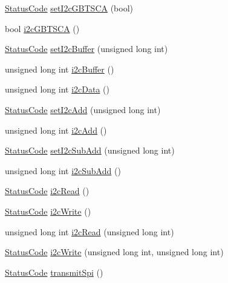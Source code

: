 \begin{DoxyCompactItemize}
\hyperlink{classStatusCode}{Status\+Code} \hyperlink{classFePGA_ac9a16de5f01fda901494abe61efb5029}{set\+I2c\+G\+B\+T\+S\+CA} (bool)
\item 
bool \hyperlink{classFePGA_a210cf57766c4f818ea61af671e91cfeb}{i2c\+G\+B\+T\+S\+CA} ()
\item 
\hyperlink{classStatusCode}{Status\+Code} \hyperlink{classFePGA_aaf52ed549f6b79d53f49c3f85c5fbad2}{set\+I2c\+Buffer} (unsigned long int)
\item 
unsigned long int \hyperlink{classFePGA_a5577463c8478cb6d54fc3c75b26cd819}{i2c\+Buffer} ()
\item 
unsigned long int \hyperlink{classFePGA_a9c261a09d323c07ec4b9e925d4dfc353}{i2c\+Data} ()
\item 
\hyperlink{classStatusCode}{Status\+Code} \hyperlink{classFePGA_a2da860f836e04ecc54056d0bf8cc8f98}{set\+I2c\+Add} (unsigned long int)
\item 
unsigned long int \hyperlink{classFePGA_a26b690b730b5f668ab28fb8deab8326b}{i2c\+Add} ()
\item 
\hyperlink{classStatusCode}{Status\+Code} \hyperlink{classFePGA_a37c1ee5bf89667c641f321479697166f}{set\+I2c\+Sub\+Add} (unsigned long int)
\item 
unsigned long int \hyperlink{classFePGA_ab51ac1c71e33f7444212de0e89e1f436}{i2c\+Sub\+Add} ()
\item 
\hyperlink{classStatusCode}{Status\+Code} \hyperlink{classFePGA_a939c5c23077210a2ad851a12694657a4}{i2c\+Read} ()
\item 
\hyperlink{classStatusCode}{Status\+Code} \hyperlink{classFePGA_a27b9c9bb486cea35b1bbcac5da96f527}{i2c\+Write} ()
\item 
unsigned long int \hyperlink{classFePGA_adf1c43786131d0f500b4662a877229c7}{i2c\+Read} (unsigned long int)
\item 
\hyperlink{classStatusCode}{Status\+Code} \hyperlink{classFePGA_a45e1cfdf1f303f3958bf6a83c4e8039b}{i2c\+Write} (unsigned long int, unsigned long int)
\item 
\hyperlink{classStatusCode}{Status\+Code} \hyperlink{classFePGA_ac7698a9f59f7290a6bb648030976597f}{transmit\+Spi} ()
\end{DoxyCompactItemize}
